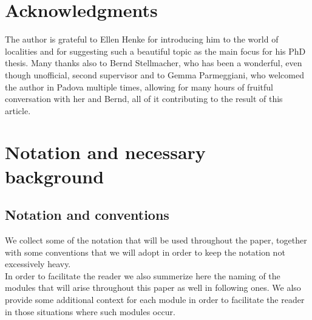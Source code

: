 \documentclass{amsart}
\numberwithin{equation}{section}
\theoremstyle{definition}
\theoremstyle{subresult}
\theoremstyle{caseresult}
\newcommand{\<}{\langle}
\renewcommand{\>}{\rangle}
\begin{document}
\vspace{1cm}

\section*{Acknowledgments}
The author is grateful to Ellen Henke for introducing him to the world of localities and for suggesting such a beautiful topic as the main focus for his PhD thesis. Many thanks also to Bernd Stellmacher, who has been a wonderful, even though unofficial, second supervisor and to Gemma Parmeggiani, who welcomed the author in Padova multiple times, allowing for many hours of fruitful conversation with her and Bernd, all of it contributing to the result of this article.


\newpage

\section{Notation and necessary background}
\label{background}

\subsection{Notation and conventions}
We collect some of the notation that will be used throughout the paper, together with some conventions that we will adopt in order to keep the notation not excessively heavy.\\
In order to facilitate the reader we also summerize here the naming of the modules that will arise throughout this paper as well in following ones. We also provide some additional context for each module in order to facilitate the reader in those situations where such modules occur.\\
\end{document}
